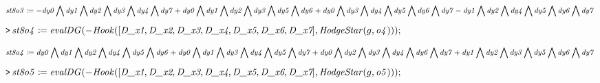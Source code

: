 \documentclass{article}
\begin{document}
\begin{dmath}\label{(20)}
\mathit{st8o3} \coloneqq -\mathit{dy0} \bigwedge  \mathit{dy1}  \bigwedge  \mathit{dy2}  \bigwedge  \mathit{dy3}  \bigwedge  \mathit{dy4} 
\\
 \bigwedge  \mathit{dy7} +\mathit{dy0} \bigwedge  \mathit{dy1}  \bigwedge  \mathit{dy2}  \bigwedge  \mathit{dy3}  \bigwedge  \mathit{dy5} 
\\
 \bigwedge  \mathit{dy6} +\mathit{dy0} \bigwedge  \mathit{dy3}  \bigwedge  \mathit{dy4}  \bigwedge  \mathit{dy5}  \bigwedge  \mathit{dy6} 
\\
 \bigwedge  \mathit{dy7} -\mathit{dy1} \bigwedge  \mathit{dy2}  \bigwedge  \mathit{dy4}  \bigwedge  \mathit{dy5}  \bigwedge  \mathit{dy6} 
\\
 \bigwedge  \mathit{dy7} 
\end{dmath}
\mapleinput
{$ \displaystyle \texttt{>\,} \mathit{st8o4} \coloneqq \mathit{evalDG} (-\mathit{Hook} ([\textit{D\_x1} ,\textit{D\_x2} ,\textit{D\_x3} ,\textit{D\_x4} ,\textit{D\_x5} ,\textit{D\_x6} ,\textit{D\_x7}],\mathit{HodgeStar} (g ,\mathit{o4})));\, $}

\begin{dmath}\label{(21)}
\mathit{st8o4} \coloneqq \mathit{dy0} \bigwedge  \mathit{dy1}  \bigwedge  \mathit{dy2}  \bigwedge  \mathit{dy4}  \bigwedge  \mathit{dy5} 
\\
 \bigwedge  \mathit{dy6} +\mathit{dy0} \bigwedge  \mathit{dy1}  \bigwedge  \mathit{dy3}  \bigwedge  \mathit{dy4}  \bigwedge  \mathit{dy5} 
\\
 \bigwedge  \mathit{dy7} +\mathit{dy0} \bigwedge  \mathit{dy2}  \bigwedge  \mathit{dy3}  \bigwedge  \mathit{dy4}  \bigwedge  \mathit{dy6} 
\\
 \bigwedge  \mathit{dy7} +\mathit{dy1} \bigwedge  \mathit{dy2}  \bigwedge  \mathit{dy3}  \bigwedge  \mathit{dy5}  \bigwedge  \mathit{dy6} 
\\
 \bigwedge  \mathit{dy7} 
\end{dmath}
\mapleinput
{$ \displaystyle \texttt{>\,} \mathit{st8o5} \coloneqq \mathit{evalDG} (-\mathit{Hook} ([\textit{D\_x1} ,\textit{D\_x2} ,\textit{D\_x3} ,\textit{D\_x4} ,\textit{D\_x5} ,\textit{D\_x6} ,\textit{D\_x7}],\mathit{HodgeStar} (g ,\mathit{o5})));\, $}
\end{document}
